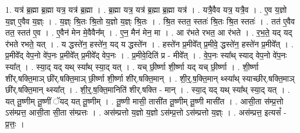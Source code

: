 \documentclass[17pt]{extarticle}
\begin{document}
1. यत्र॑ ब्र॒ह्मा ब्र॒ह्मा यत्र॒ यत्र॑ ब्र॒ह्मा । . ब्र॒ह्मा यत्र॒ यत्र॑ ब्र॒ह्मा ब्र॒ह्मा यत्र॑ । . यत्रै॒वैव यत्र॒ यत्रै॒व । . ए॒व य॒ज्ञो य॒ज्ञ् ए॒वैव य॒ज्ञ्ः । . य॒ज्ञ्ः श्रि॒तः श्रि॒तो य॒ज्ञो य॒ज्ञ्ः श्रि॒तः । . श्रि॒त स्तत॒ स्ततः॑ श्रि॒तः श्रि॒त स्ततः॑ । . तत॑ ए॒वैव तत॒ स्तत॑ ए॒व । . ए॒वैन॑ मेन मे॒वैवैन᳚म् । . ए॒न॒ मैन॑ मेन॒ मा । . आ र॑भते रभत॒ आ र॑भते । . र॒भ॒ते॒ यद् यद् र॑भते रभते॒ यत् । . य द्धस्ते॑न॒ हस्ते॑न॒ यद् य द्धस्ते॑न । . हस्ते॑न प्र॒मीवे᳚त् प्र॒मीवे॒ द्धस्ते॑न॒ हस्ते॑न प्र॒मीवे᳚त् । . प्र॒मीवे᳚द् वेप॒नो वे॑प॒नः प्र॒मीवे᳚त् प्र॒मीवे᳚द् वेप॒नः । . प्र॒मीवे॒दिति॑ प्र - मीवे᳚त् । . वे॒प॒नः स्या᳚थ् स्याद् वेप॒नो वे॑प॒नः स्या᳚त् । . स्या॒द् यद् यथ् स्या᳚थ् स्या॒द् यत् । . यच् छी॒र्ष्णा शी॒र्ष्णा यद् यच् छी॒र्ष्णा । . शी॒र्ष्णा शी॑र्.षक्ति॒माञ् छी॑र्.षक्ति॒माञ् छी॒र्ष्णा शी॒र्ष्णा शी॑र्.षक्ति॒मान् । . शी॒र्॒.ष॒क्ति॒मान् थ्स्या᳚थ् स्याच्छीर्.षक्ति॒माञ् छी॑र्.षक्ति॒मान् थ्स्या᳚त् । . शी॒र्॒.ष॒क्ति॒मानिति॑ शीर्.षक्ति - मान् । . स्या॒द् यद् यथ् स्या᳚थ् स्या॒द् यत् । . यत् तू॒ष्णीम् तू॒ष्णीं ॅयद् यत् तू॒ष्णीम् । . तू॒ष्णी मासी॒ तासी॑त तू॒ष्णीम् तू॒ष्णी मासी॑त । . आसी॒ता स॑म्प्र॒त्तो ऽस॑म्प्रत्त॒ आसी॒ता सी॒ता स॑म्प्रत्तः । . अस॑म्प्रत्तो य॒ज्ञो य॒ज्ञो ऽस॑म्प्र॒त्तो ऽस॑म्प्रत्तो य॒ज्ञ्ः । . अस॑म्प्रत्त॒ इत्यसं᳚ - प्र॒त्तः॒ । \newline
\end{document}
